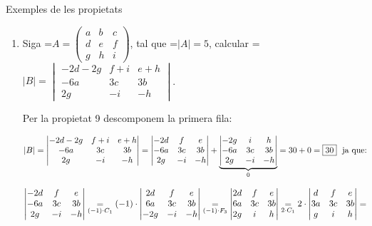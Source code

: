 \documentclass[11pt,a4paper]{article}
\newcommand{\fmm}[1]{\setbox0=\hbox{$#1$}\ifdim\wd0>\linewidth\fmdisp{#1}\else\mbox{\box0}\fi}
\newcommand{\fmdisp}[1]{\[\setbox2=\hbox{$\displaystyle #1$}\ifdim\wd2>\linewidth\resizebox{\linewidth}{!}{\box2}\else\box2\fi\]}
\begin{document}
\begin{fmex}{Exemples de les propietats}
\begin{enumerate}[label=\textbf{\arabic*.},leftmargin=*]
Aleshores:

\fmdisp{|A^4|=\begin{vmatrix}1 & 210 & 163\\ 0 & 269 & 210\\ 0 & 210 & 164\end{vmatrix}=1\cdot(269\cdot164-210\cdot210)=\boxed{16}}

\item Siga \fmm{A=\begin{pmatrix}a & b & c\\ d & e & f\\ g & h & i\end{pmatrix}}, tal que \fmm{|A|=5}, calcular \fmm{|B|=\begin{vmatrix}-2d-2g & f+i & e+h\\ -6a & 3c & 3b\\ 2g & -i & -h\end{vmatrix}}.

Per la propietat 9 descomponem la primera fila:

\fmdisp{|B|=\begin{vmatrix}-2d-2g & f+i & e+h\\ -6a & 3c & 3b\\ 2g & -i & -h\end{vmatrix}=\begin{vmatrix}-2d & f & e\\ -6a & 3c & 3b\\ 2g & -i & -h\end{vmatrix}+\underbrace{\begin{vmatrix}-2g & i & h\\ -6a & 3c & 3b\\ 2g & -i & -h\end{vmatrix}}_{0}=30+0=\boxed{30}\ \ \text{ja que:}}

\fmdisp{\begin{vmatrix}-2d & f & e\\ -6a & 3c & 3b\\ 2g & -i & -h\end{vmatrix}\underset{(-1)\cdot C_1}{=}(-1)\cdot\begin{vmatrix}2d & f & e\\ 6a & 3c & 3b\\ -2g & -i & -h\end{vmatrix}\underset{(-1)\cdot F_3}{=}\begin{vmatrix}2d & f & e\\ 6a & 3c & 3b\\ 2g & i & h\end{vmatrix}\underset{2\cdot C_1}{=}2\cdot\begin{vmatrix}d & f & e\\ 3a & 3c & 3b\\ g & i & h\end{vmatrix}=}


\end{enumerate}
\end{fmex}
\end{document}
